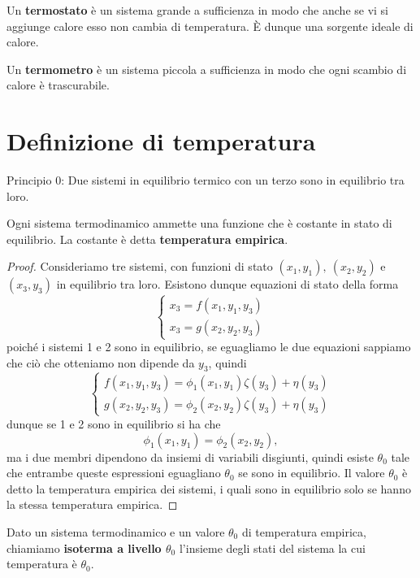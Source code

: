 \documentclass[a4paper]{report}
\begin{document}
\begin{definition}[Termostato]
Un \textbf{termostato} \`e un sistema grande a sufficienza in modo che anche se vi si aggiunge calore esso non cambia di temperatura. \`E dunque una sorgente ideale di calore.
\end{definition}

\begin{definition}[Termometro]
Un \textbf{termometro} \`e un sistema piccola a sufficienza in modo che ogni scambio di calore \`e trascurabile.
\end{definition}

\section{Definizione di temperatura}
Principio $0$: Due sistemi in equilibrio termico con un terzo sono in equilibrio tra loro.

\begin{proposition}\label{TemperaturaEmpirica}
Ogni sistema termodinamico ammette una funzione che \`e costante in stato di equilibrio. La costante \`e detta \textbf{temperatura empirica}.
\end{proposition}
\begin{proof}
Consideriamo tre sistemi, con funzioni di stato $(x_1, y_1),\ (x_2,y_2)$ e $(x_3,y_3)$ in equilibrio tra loro. Esistono dunque equazioni di stato della forma
\[\begin{cases}
x_3=f(x_1,y_1,y_3)\\
x_3=g(x_2,y_2,y_3)
\end{cases}\]
poich\'e i sistemi 1 e 2 sono in equilibrio, se eguagliamo le due equazioni sappiamo che ci\`o che otteniamo non dipende da $y_3$, quindi
\[\begin{cases}
f(x_1,y_1,y_3)=\phi_1(x_1,y_1)\zeta(y_3)+\eta(y_3)\\
g(x_2,y_2,y_3)=\phi_2(x_2,y_2)\zeta(y_3)+\eta(y_3)
\end{cases}\]
dunque se 1 e 2 sono in equilibrio si ha che 
\[\phi_1(x_1,y_1)=\phi_2(x_2,y_2),\]
ma i due membri dipendono da insiemi di variabili disgiunti, quindi esiste $\theta_0$ tale che entrambe queste espressioni eguagliano $\theta_0$ se sono in equilibrio. Il valore $\theta_0$ \`e detto la temperatura empirica dei sistemi, i quali sono in equilibrio solo se hanno la stessa temperatura empirica.
\end{proof}

\begin{definition}[Isoterme]
Dato un sistema termodinamico e un valore $\theta_0$ di temperatura empirica, chiamiamo \textbf{isoterma a livello $\theta_0$} l'insieme degli stati del sistema la cui temperatura \`e $\theta_0$.
\end{definition}
\end{document}
